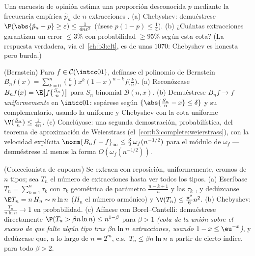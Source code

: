 \begin{exercise}[$\star\star$]\label{exo:b3:probability:7}
Una encuesta de opinión estima una proporción desconocida $p$ mediante
la frecuencia empírica $\hat p_n$ de $n$ extracciones
. (a) Chebyshev:
demuéstrese $\P(\abs{\hat p_n - p} \geq \varepsilon)
\leq \frac1{4n\varepsilon^2}$ (úsese $p(1-p) \leq \frac14$). (b)
¿Cuántas extracciones garantizan un error $\leq 3\%$ con probabilidad
$\geq 95\%$ según esta cota? (La respuesta verdadera, vía
el~\cref{ch:b3:clt}, es de unas $1070$: Chebyshev es honesta pero
burda.)
\end{exercise}

\begin{exercise}[$\star\star\star$]\label{exo:b3:probability:8}
(Bernstein) Para $f \in \mathcal C(\intcc01)$, defínase el polinomio de
Bernstein $B_nf(x) =
\sum_{k=0}^n\binom nkx^k(1-x)^{n-k}f\bigl(\frac kn\bigr)$. (a)
Reconózcase $B_nf(x) = \E\bigl[f\bigl(\frac
{S_n}n\bigr)\bigr]$ para $S_n$ binomial $\mathcal B(n, x)$. (b)
Demuéstrese $B_nf \to f$ \emph{uniformemente} en $\intcc01$: sepárese
según $\{\abs{\frac{S_n}n - x} \leq \delta\}$ y su complementario,
usando la  uniforme y
Chebyshev con la cota uniforme $\V(\frac{S_n}n) \leq \frac1{4n}$. (c)
Conclúyase: una segunda demostración, probabilística, del teorema de
aproximación de Weierstrass (el~\cref{cor:b3:complete:weierstrass}), con
la velocidad explícita
$\norm{B_nf - f}_\infty \leq \frac32\,\omega_f(n^{-1/2})$
para el módulo de 
$\omega_f$ --- demuéstrese al menos la forma $O(\omega_f(n^{-1/2}))$.
\end{exercise}

\begin{exercise}[$\star\star\star$]\label{exo:b3:probability:9}
(Coleccionista de cupones) Se extraen con reposición, uniformemente,
cromos de $n$ tipos; sea $T_n$ el número de extracciones hasta ver todos
los tipos. (a) Escríbase $T_n = \sum_{k=1}^{n}\tau_k$ con $\tau_k$
geométrica de parámetro $\frac{n - k + 1}n$ y las $\tau_k$
, y dedúzcanse
$\E T_n = n\,H_n \sim n\ln n$ ($H_n$ el número armónico) y $\V(T_n) \leq
\frac{\pi^2}6n^2$. (b) Chebyshev: $\frac{T_n}{n\ln n} \to 1$ en
probabilidad. (c) Afínese con Borel--Cantelli: demuéstrese directamente
$\P(T_n >
\beta n\ln n) \leq n^{1 - \beta}$ para $\beta > 1$ \emph{(cota de la
unión sobre el suceso de que falte algún tipo tras $\beta n\ln n$
extracciones, usando $1 - x \leq \eu^{-x}$)}, y dedúzcase que, a lo
largo de $n = 2^m$, c.s.\ $T_n \leq \beta n\ln
n$ a partir de cierto índice, para todo $\beta > 2$.
\end{exercise}

